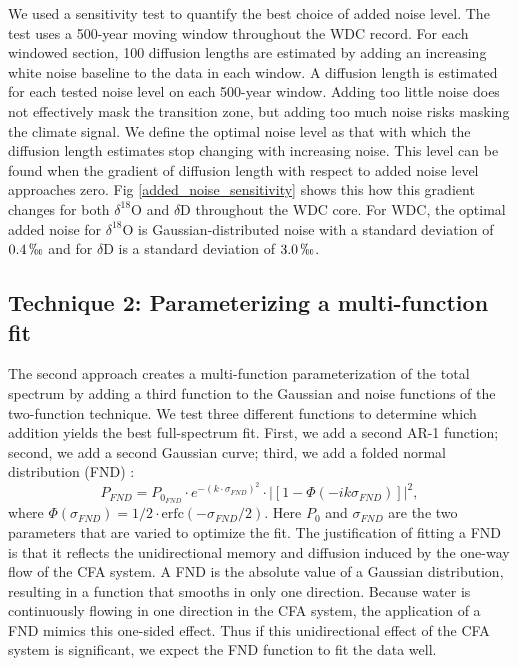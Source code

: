 \documentclass[draft, jgrga]{AGUTeX}
\begin{document}
\begin{article}
We used a sensitivity test to quantify the best choice of added noise level. The test uses a 500-year moving window throughout the WDC record. For each windowed section, 100 diffusion lengths are estimated by adding an increasing white noise baseline to the data in each window. A diffusion length is estimated for each tested noise level on each 500-year window. Adding too little noise does not effectively mask the transition zone, but adding too much noise risks masking the climate signal. We define the optimal noise level as that with which the diffusion length estimates stop changing with increasing noise. This level can be found when the gradient of diffusion length with respect to added noise level approaches zero. Fig \ref{added_noise_sensitivity} shows this how this gradient changes for both $\delta^{18}$O and $\delta$D throughout the WDC core. For WDC, the optimal added noise for $\delta^{18}$O is Gaussian-distributed noise with a standard deviation of $0.4 \, \permil$ and for $\delta$D is a standard deviation of $3.0 \,\permil$.

\subsection{Technique 2: Parameterizing a multi-function fit}
The second approach creates a multi-function parameterization of the total spectrum by adding a third function to the Gaussian and noise functions of the two-function technique. We test three different functions to determine which addition yields the best full-spectrum fit. First, we add a second AR-1 function; second, we add a second Gaussian curve; third, we add a folded normal distribution (FND) \citep{Tsagris2014}:
\begin{equation}
P_{FND} = P_{0_{FND}} \cdot e^{-(k \cdot \sigma_{FND})^2} \cdot |\left[1 - \Phi(-i k \sigma_{FND})\right]|^2,
\end{equation}
where $\Phi(\sigma_{FND}) = 1/2\cdot \mathrm{erfc}(-\sigma_{FND}/2) $. Here $P_0$ and $\sigma_{FND}$ are the two parameters that are varied to optimize the fit. The justification of fitting a FND is that it reflects the unidirectional memory and diffusion induced by the one-way flow of the CFA system. A FND is the absolute value of a Gaussian distribution, resulting in a function that smooths in only one direction. Because water is continuously flowing in one direction in the CFA system, the application of a FND mimics this one-sided effect. Thus if this unidirectional effect of the CFA system is significant, we expect the FND function to fit the data well.


\end{article}
\end{document}
